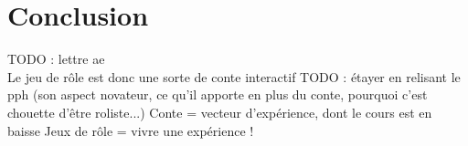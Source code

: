 \section{Conclusion}
TODO : lettre ae\\
Le jeu de rôle est donc une sorte de conte interactif
TODO : étayer en relisant le pph (son aspect novateur, ce qu'il apporte en plus du conte, pourquoi c'est chouette d'être roliste...)
Conte = vecteur d'expérience, dont le cours est en baisse
Jeux de rôle = vivre une expérience !

\clearpage
